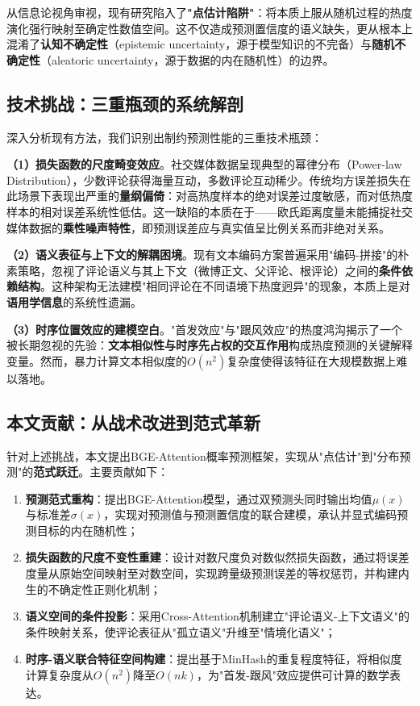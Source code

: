 \documentclass[10pt]{article}
\begin{document}
从信息论视角审视，现有研究陷入了\textbf{"点估计陷阱"}：将本质上服从随机过程的热度演化强行映射至确定性数值空间。这不仅造成预测置信度的语义缺失，更从根本上混淆了\textbf{认知不确定性}（epistemic uncertainty，源于模型知识的不完备）与\textbf{随机不确定性}（aleatoric uncertainty，源于数据的内在随机性）的边界。

\subsection{技术挑战：三重瓶颈的系统解剖}

深入分析现有方法，我们识别出制约预测性能的三重技术瓶颈：

\textbf{（1）损失函数的尺度畸变效应}。社交媒体数据呈现典型的幂律分布（Power-law Distribution），少数评论获得海量互动，多数评论互动稀少。传统均方误差损失在此场景下表现出严重的\textbf{量纲偏倚}：对高热度样本的绝对误差过度敏感，而对低热度样本的相对误差系统性低估。这一缺陷的本质在于——欧氏距离度量未能捕捉社交媒体数据的\textbf{乘性噪声特性}，即预测误差应与真实值呈比例关系而非绝对关系。

\textbf{（2）语义表征与上下文的解耦困境}。现有文本编码方案普遍采用"编码-拼接"的朴素策略，忽视了评论语义与其上下文（微博正文、父评论、根评论）之间的\textbf{条件依赖结构}。这种架构无法建模"相同评论在不同语境下热度迥异"的现象，本质上是对\textbf{语用学信息}的系统性遗漏。

\textbf{（3）时序位置效应的建模空白}。"首发效应"与"跟风效应"的热度鸿沟揭示了一个被长期忽视的先验：\textbf{文本相似性与时序先占权的交互作用}构成热度预测的关键解释变量。然而，暴力计算文本相似度的$O(n^2)$复杂度使得该特征在大规模数据上难以落地。

\subsection{本文贡献：从战术改进到范式革新}

针对上述挑战，本文提出BGE-Attention概率预测框架，实现从"点估计"到"分布预测"的\textbf{范式跃迁}。主要贡献如下：

\begin{enumerate}[leftmargin=*]
    \item \textbf{预测范式重构}：提出BGE-Attention模型，通过双预测头同时输出均值$\mu(x)$与标准差$\sigma(x)$，实现对预测值与预测置信度的联合建模，承认并显式编码预测目标的内在随机性；
    \item \textbf{损失函数的尺度不变性重建}：设计对数尺度负对数似然损失函数，通过将误差度量从原始空间映射至对数空间，实现跨量级预测误差的等权惩罚，并构建内生的不确定性正则化机制；
    \item \textbf{语义空间的条件投影}：采用Cross-Attention机制建立"评论语义-上下文语义"的条件映射关系，使评论表征从"孤立语义"升维至"情境化语义"；
    \item \textbf{时序-语义联合特征空间构建}：提出基于MinHash的重复程度特征，将相似度计算复杂度从$O(n^2)$降至$O(nk)$，为"首发-跟风"效应提供可计算的数学表达。
\end{enumerate}
\end{document}
